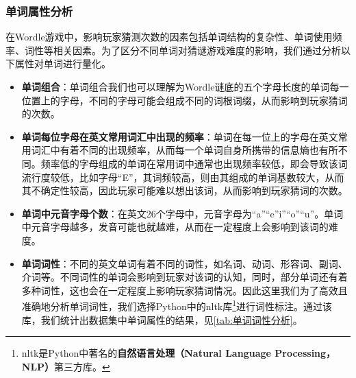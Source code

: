 \documentclass{MathModeling}
\begin{document}
	\subsubsection{单词属性分析}
	在Wordle游戏中，影响玩家猜测次数的因素包括单词结构的复杂性、单词使用频率、词性等相关因素。为了区分不同单词对猜谜游戏难度的影响，我们通过分析以下属性对单词进行量化。
\begin{itemize}
	\item \textbf{单词组合}：单词组合我们也可以理解为Wordle谜底的五个字母长度的单词每一位置上的字母，不同的字母可能会组成不同的词根词缀，从而影响到玩家猜词的次数。
	\item \textbf{单词每位字母在英文常用词汇中出现的频率}：单词在每一位上的字母在英文常用词汇中有着不同的出现频率，从而每一个单词自身所携带的信息熵也有所不同。频率低的字母组成的单词在常用词中通常也出现频率较低，即会导致该词流行度较低，比如字母“E”，其词频较高，则由其组成的单词基数较大，从而其不确定性较高，因此玩家可能难以想出该词，从而影响到玩家猜词的次数。
	\item \textbf{单词中元音字母个数}：在英文26个字母中，元音字母为“a”“e”i”“o”“u”。单词中元音字母越多，发音可能也就越难，从而在一定程度上会影响到该词的难度。
	\item \textbf{单词词性}：不同的英文单词有着不同的词性，如名词、动词、形容词、副词、介词等。不同词性的单词会影响到玩家对该词的认知，同时，部分单词还有着多种词性，这也会在一定程度上影响玩家猜词情况。因此这里我们为了高效且准确地分析单词词性，我们选择Python中的nltk库\textcolor{blue}{\footnote{nltk是Python中著名的\textbf{自然语言处理（Natural Language Processing，NLP）}第三方库。}}进行词性标注。通过该库，我们统计出数据集中单词属性的结果，见\textcolor{blue}{\cref{tab:单词词性分析}}。
\begin{table}[H]
	\centering
	\caption{单词词性分析}
\end{table}
\end{itemize}
\end{document}
